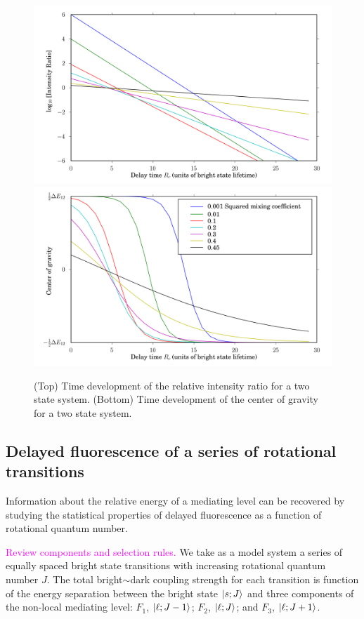 \documentclass[12pt,draft]{mitthesis}
\newcommand{\POINT}[1]{\textcolor{magenta}{#1}}
\begin{document}
\begin{figure}
  \caption{(Top) Time development of the relative intensity ratio for
    a two state system. (Bottom) Time development of the center of
    gravity for a two state system.}
  \label{fig:cog-devel}
  \centering
  \includegraphics[width=6in]{ratio-development.png}
  \includegraphics[width=6in]{cog-development.png}
\end{figure}

\subsection{Delayed fluorescence of a series of rotational
  transitions}

Information about the relative energy of a mediating level can be
recovered by studying the statistical properties of delayed
fluorescence as a function of rotational quantum number.

\POINT{Review components and selection rules.}  We take as a model
system a series of equally spaced bright state transitions with
increasing rotational quantum number $J$.  The total bright$\sim$dark
coupling strength for each transition is function of the energy
separation between the bright state $\mathinner{|{s;J}\rangle}$ and three components
of the non-local mediating level: $F_1$, $\mathinner{|{\ell;J-1}\rangle}$; $F_2$,
$\mathinner{|{\ell;J}\rangle}$; and $F_3$, $\mathinner{|{\ell;J+1}\rangle}$.
\end{document}
